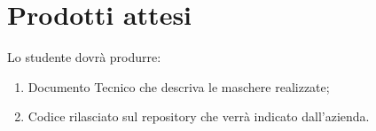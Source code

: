 \section*{Prodotti attesi}
Lo studente dovrà produrre:
\begin{enumerate}
    \item Documento Tecnico che descriva le maschere realizzate; 
    
    \item Codice rilasciato sul repository che verrà indicato dall’azienda.
\end{enumerate}

